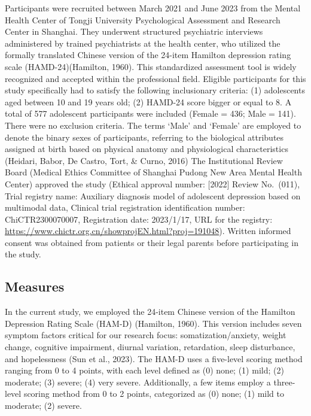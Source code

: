 \documentclass[
  man,floatsintext]{apa6}
\begin{document}
Participants were recruited between March 2021 and June 2023 from the Mental Health Center of Tongji University Psychological Assessment and Research Center in Shanghai. They underwent structured psychiatric interviews administered by trained psychiatrists at the health center, who utilized the formally translated Chinese version of the 24-item Hamilton depression rating scale (HAMD-24)(Hamilton, 1960). This standardized assessment tool is widely recognized and accepted within the professional field. Eligible participants for this study specifically had to satisfy the following inclusionary criteria: (1) adolescents aged between 10 and 19 years old; (2) HAMD-24 score bigger or equal to 8. A total of 577 adolescent participants were included (Female = 436; Male = 141). There were no exclusion criteria. The terms `Male' and `Female' are employed to denote the binary sexes of participants, referring to the biological attributes assigned at birth based on physical anatomy and physiological characteristics (Heidari, Babor, De Castro, Tort, \& Curno, 2016) The Institutional Review Board (Medical Ethics Committee of Shanghai Pudong New Area Mental Health Center) approved the study (Ethical approval number: {[}2022{]} Review No.~(011), Trial registry name: Auxiliary diagnosis model of adolescent depression based on multimodal data, Clinical trial registration identification number: ChiCTR2300070007, Registration date: 2023/1/17, URL for the registry: \url{https://www.chictr.org.cn/showprojEN.html?proj=191048}). Written informed consent was obtained from patients or their legal parents before participating in the study.

\hypertarget{measures}{%
\subsection{Measures}\label{measures}}

In the current study, we employed the 24-item Chinese version of the Hamilton Depression Rating Scale (HAM-D) (Hamilton, 1960). This version includes seven symptom factors critical for our research focus: somatization/anxiety, weight change, cognitive impairment, diurnal variation, retardation, sleep disturbance, and hopelessness (Sun et al., 2023). The HAM-D uses a five-level scoring method ranging from 0 to 4 points, with each level defined as (0) none; (1) mild; (2) moderate; (3) severe; (4) very severe. Additionally, a few items employ a three-level scoring method from 0 to 2 points, categorized as (0) none; (1) mild to moderate; (2) severe.
\end{document}
